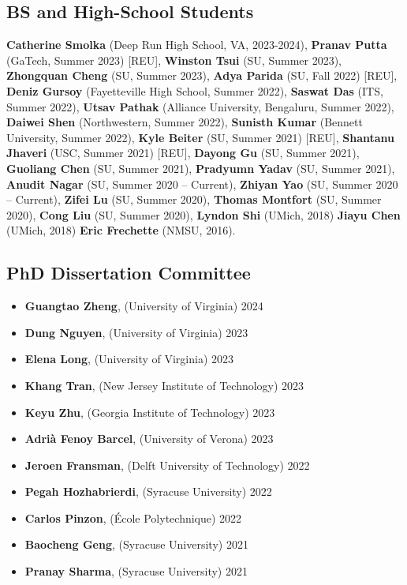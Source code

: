 \subsection*{BS and High-School Students}
  \textbf{Catherine Smolka} (Deep Run High School, VA, 2023-2024), 
  \textbf{Pranav Putta} (GaTech, Summer 2023) [REU],
  \textbf{Winston Tsui} (SU, Summer 2023),
  \textbf{Zhongquan Cheng} (SU, Summer 2023), 
  \textbf{Adya Parida} (SU, Fall 2022) [REU], 
  \textbf{Deniz Gursoy} (Fayetteville High School, Summer 2022), 
  \textbf{Saswat Das} (ITS, Summer 2022), 
  \textbf{Utsav Pathak} (Alliance University, Bengaluru, Summer 2022),
  \textbf{Daiwei Shen} (Northwestern, Summer 2022),
  \textbf{Sunisth Kumar} (Bennett University, Summer 2022),
  \textbf{Kyle Beiter} (SU, Summer 2021) [REU],  %
  \textbf{Shantanu Jhaveri} (USC, Summer 2021) [REU], %
  \textbf{Dayong Gu} (SU, Summer 2021),
  \textbf{Guoliang Chen} (SU, Summer 2021),
  \textbf{Pradyumn Yadav} (SU, Summer 2021),
  \textbf{Anudit Nagar} (SU, Summer 2020 -- Current), 
  \textbf{Zhiyan Yao} (SU, Summer 2020 -- Current),
  \textbf{Zifei Lu} (SU, Summer 2020),
  \textbf{Thomas Montfort} (SU, Summer 2020),
  \textbf{Cong Liu} (SU, Summer 2020),
  \textbf{Lyndon Shi} (UMich, 2018)
  \textbf{Jiayu Chen} (UMich, 2018)
  \textbf{Eric Frechette} (NMSU, 2016).

\medskip

\subsection*{PhD Dissertation Committee}
\begin{itemize}
  \item \textbf{Guangtao Zheng}, ({\sc University of Virginia}) \hfill 2024
  \item \textbf{Dung Nguyen}, ({\sc University of Virginia}) \hfill 2023
  \item \textbf{Elena Long}, ({\sc University of Virginia}) \hfill 2023
  \item \textbf{Khang Tran}, ({\sc New Jersey Institute of Technology}) \hfill 2023
  \item \textbf{Keyu Zhu}, ({\sc Georgia Institute of Technology}) \hfill 2023
  \item \textbf{Adrià Fenoy Barcel}, ({\sc University of Verona}) \hfill 2023
  \item \textbf{Jeroen Fransman}, ({\sc Delft University of Technology}) \hfill 2022
  \item \textbf{Pegah Hozhabrierdi}, ({\sc Syracuse University}) \hfill 2022
  \item \textbf{Carlos Pinzon}, ({\sc École Polytechnique}) \hfill 2022
  \item \textbf{Baocheng Geng}, ({\sc Syracuse University}) \hfill 2021
  \item \textbf{Pranay Sharma}, ({\sc Syracuse University}) \hfill 2021
\end{itemize}
\medskip